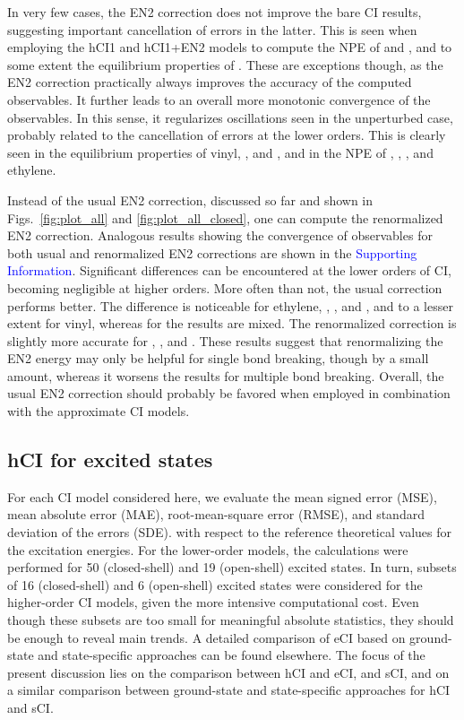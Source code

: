 \documentclass[aip,jcp,reprint,noshowkeys,superscriptaddress]{revtex4-1}
\newcommand{\SupInf}{\textcolor{blue}{Supporting Information}}
\begin{document}
In very few cases, the EN2 correction does not improve the bare CI results, suggesting important cancellation of errors in the latter.
This is seen when employing the hCI1 and hCI1+EN2 models to compute the NPE of  and , and to some extent the equilibrium properties of .
These are exceptions though, as the EN2 correction practically always improves the accuracy of the computed observables.
It further leads to an overall more monotonic convergence of the observables.
In this sense, it regularizes oscillations seen in the unperturbed case, probably related to the cancellation of errors at the lower orders.
This is clearly seen in the equilibrium properties of vinyl, , and ,
and in the NPE of , , , and ethylene.

Instead of the usual EN2 correction, discussed so far and shown in Figs.~\ref{fig:plot_all} and \ref{fig:plot_all_closed},
one can compute the renormalized EN2 correction. \cite{Garniron_2019}
Analogous results showing the convergence of observables for both usual and renormalized EN2 corrections are shown in the {\SupInf}.
Significant differences can be encountered at the lower orders of CI, becoming negligible at higher orders.
More often than not, the usual correction performs better.
The difference is noticeable for ethylene, , , and , and to a lesser extent for vinyl,
whereas for  the results are mixed.
The renormalized correction is slightly more accurate for , , and .
These results suggest that renormalizing the EN2 energy may only be helpful for single bond breaking, though by a small amount,
whereas it worsens the results for multiple bond breaking.
Overall, the usual EN2 correction should probably be favored when employed in combination with the approximate CI models.

\subsection{hCI for excited states}
\label{sec:res_C}

For each CI model considered here, we evaluate the mean signed error (MSE), mean absolute error (MAE), root-mean-square error (RMSE), and standard deviation of the errors (SDE).
with respect to the reference theoretical values for the excitation energies.
For the lower-order models, the calculations were performed for 50 (closed-shell) and 19 (open-shell) excited states.
In turn, subsets of 16 (closed-shell) and 6 (open-shell) excited states were considered for the higher-order CI models, given the more intensive computational cost.
Even though these subsets are too small for meaningful absolute statistics, they should be enough to reveal main trends.
A detailed comparison of eCI based on ground-state and state-specific approaches can be found elsewhere. \cite{Kossoski_2023}
The focus of the present discussion lies on the comparison between hCI and eCI, and sCI,
and on a similar comparison between ground-state and state-specific approaches for hCI and sCI.
\end{document}
